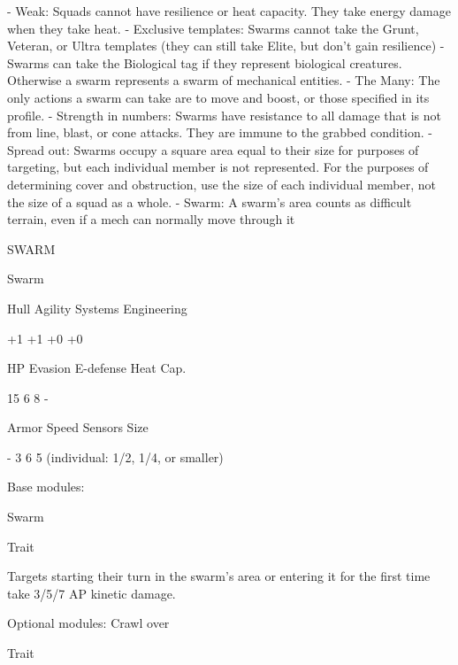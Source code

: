     -    Weak: Squads cannot have resilience or heat capacity. They take energy damage when  
         they take heat.  
    -    Exclusive templates: Swarms cannot take the Grunt, Veteran, or Ultra templates (they  
         can still take Elite, but don’t gain resilience)  
    -    Swarms can take the Biological tag if they represent biological creatures. Otherwise a  
         swarm represents a swarm of mechanical entities.  
    -    The Many: The only actions a swarm can take are to move and boost, or those specified  
         in its profile.  
    -    Strength in numbers: Swarms have resistance to all damage that is not from line, blast,  
         or cone attacks. They are immune to the grabbed condition.  
    -    Spread out: Swarms occupy a square area equal to their size for purposes of targeting,  
         but each individual member is not represented. For the purposes of determining cover  
         and obstruction, use the size of each individual member, not the size of a squad as a  
         whole.  
    -    Swarm: A swarm’s area counts as difficult terrain, even if a mech can normally move  
         through it  

       SWARM 

       Swarm 

       Hull       Agility      Systems       Engineering 

       +1         +1           +0            +0 

       HP         Evasion      E-defense     Heat Cap. 

       15         6            8             - 

       Armor      Speed        Sensors       Size 

       -          3            6             5 (individual:  
                                             1/2, 1/4, or  
                                             smaller) 

Base modules:
 
Swarm
 
Trait
 
Targets starting their turn in the swarm’s area or entering it for the first time take 3/5/7 AP kinetic  
damage.
 

                                                                                                            


Optional modules:  
Crawl over
 
Trait
 
